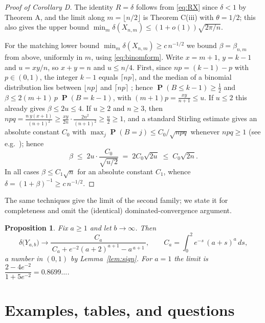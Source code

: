 \documentclass[11pt]{amsart}
\newtheorem{proposition}[theorem]{Proposition}
\theoremstyle{definition}
\theoremstyle{remark}
\newcommand{\pr}{\operatorname{\mathbf{P}}}
\begin{document}
\begin{proof}[Proof of Corollary D]
The identity $R=\delta$ follows from \eqref{eq:RX} since $\delta<1$ by
Theorem A, and the limit along $m=\lfloor n/2\rfloor$ is Theorem
C(iii) with $\theta=1/2$; this also gives the upper bound
$\min_m\delta(X_{n,m})\le(1+o(1))\sqrt{2\pi/n}$.

For the matching lower bound $\min_m\delta(X_{n,m})\ge c\,n^{-1/2}$ we
bound $\beta=\beta_{n,m}$ from above, uniformly in $m$, using
\eqref{eq:binomform}. Write $x=m+1$, $y=k-1$ and $u=xy/n$, so
$x+y=n$ and $u\le n/4$. First, since $np=(k-1)-p$ with $p\in(0,1)$,
the integer $k-1$ equals $\lceil np\rceil$, and the median of a
binomial distribution lies between $\lfloor np\rfloor$ and
$\lceil np\rceil$ \cite{KB80}; hence $\pr(B\le k-1)\ge\tfrac12$ and
$\beta\le 2(m+1)\,p\;\pr(B=k-1)$, with
$(m+1)p=\tfrac{xy}{n+1}\le u$. If $u\le2$ this already gives
$\beta\le2u\le4$. If $u\ge2$ and $n\ge3$, then
$npq=\tfrac{n\,y(x+1)}{(n+1)^2}\ge\tfrac{xy}{2n}\cdot\tfrac{2n^2}{(n+1)^2}\ge\tfrac
u2\ge1$, and a standard Stirling estimate gives an absolute constant
$C_0$ with $\max_j\pr(B=j)\le C_0/\sqrt{npq}$ whenever $npq\ge1$ (see
e.g.\ \cite[Ch.~VII]{Feller68}); hence
\[
\beta\;\le\;2u\cdot\frac{C_0}{\sqrt{u/2}}
\;=\;2C_0\sqrt{2u}\;\le\;C_0\sqrt{2n}.
\]
In all cases $\beta\le C_1\sqrt n$ for an absolute constant $C_1$,
whence $\delta=(1+\beta)^{-1}\ge c\,n^{-1/2}$.
\end{proof}

The same techniques give the limit of the second family; we state it
for completeness and omit the (identical) dominated-convergence
argument.

\begin{proposition}\label{prop:famB-asymptotic}
Fix $a\ge1$ and let $b\to\infty$. Then
\[
\delta\bigl(Y_{a,b}\bigr)\longrightarrow
\frac{C_a}{\,C_a+e^{-2}(a+2)^{a+1}-a^{\,a+1}\,},
\qquad
C_a=\int_0^2 e^{-s}\,(a+s)^{a}\,ds ,
\]
a number in $(0,1)$ by Lemma~\ref{lem:sign}. For $a=1$ the limit is
$\dfrac{2-4e^{-2}}{1+5e^{-2}}=0.8699\ldots$.
\end{proposition}

\section{Examples, tables, and questions}\label{sec:examples}
\end{document}
